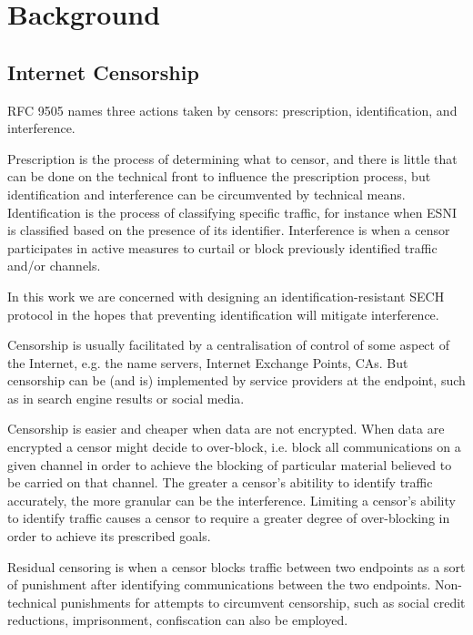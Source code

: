 \chapter{Background}


\section{Internet Censorship}

RFC 9505 \citep{rfc9505} names three actions taken by censors: prescription, identification, and interference.

Prescription is the process of determining what to censor, and there is little that can
be done on the technical front to influence the prescription process,
but identification and interference can be circumvented by technical means.
Identification is the process of classifying specific traffic,
for instance when \ac{ESNI} is
classified based on the presence of its  identifier.
Interference is when a censor participates in
active measures to curtail or block previously identified traffic and/or channels.

In this work we are concerned with designing
an identification-resistant \ac{SECH} protocol in the hopes that 
preventing identification will mitigate interference.

Censorship is usually facilitated by a centralisation of control of some aspect of the Internet, e.g. the name servers, Internet Exchange Points, CAs. But censorship can be (and is) implemented by service providers at the endpoint, such as in search engine results or social media.

Censorship is easier and cheaper when data are not encrypted. When data are encrypted a censor might decide to over-block,
i.e. block all communications on a given channel
in order to achieve the blocking of
particular material believed to be
carried on that channel.
The greater a censor's abitility to identify traffic accurately,
the more granular can be the interference.
Limiting a censor's ability to identify traffic
causes a censor to require a greater degree of over-blocking in order
to achieve its prescribed goals.

Residual censoring is when a censor blocks traffic between two endpoints as a sort of punishment after identifying communications between the two endpoints.
Non-technical punishments for attempts to circumvent censorship, such as social credit reductions, imprisonment, confiscation can also be employed.

